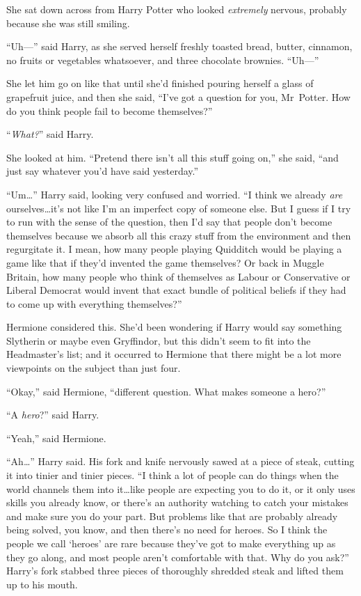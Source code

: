She sat down across from Harry Potter who looked \emph{extremely} nervous, probably because she was still smiling.

“Uh—” said Harry, as she served herself freshly toasted bread, butter, cinnamon, no fruits or vegetables whatsoever, and three chocolate brownies.
“Uh—”

She let him go on like that until she’d finished pouring herself a glass of grapefruit juice, and then she said,
“I’ve got a question for you, Mr~Potter. How do you think people fail to become themselves?”

“\emph{What?}” said Harry.

She looked at him.
“Pretend there isn’t all this stuff going on,” she said, “and just say whatever you’d have said yesterday.”

“Um…” Harry said, looking very confused and worried.
“I think we already \emph{are} ourselves…it’s not like I’m an imperfect copy of someone else. But I guess if I try to run with the sense of the question, then I’d say that people don’t become themselves because we absorb all this crazy stuff from the environment and then regurgitate it. I mean, how many people playing Quidditch would be playing a game like that if they’d invented the game themselves? Or back in Muggle Britain, how many people who think of themselves as Labour or Conservative or Liberal Democrat would invent that exact bundle of political beliefs if they had to come up with everything themselves?”

Hermione considered this. She’d been wondering if Harry would say something Slytherin or maybe even Gryffindor, but this didn’t seem to fit into the Headmaster’s list; and it occurred to Hermione that there might be a lot more viewpoints on the subject than just four.

“Okay,” said Hermione, “different question. What makes someone a hero?”

“A \emph{hero}?” said Harry.

“Yeah,” said Hermione.

“Ah…” Harry said. His fork and knife nervously sawed at a piece of steak, cutting it into tinier and tinier pieces.
“I think a lot of people can do things when the world channels them into it…like people are expecting you to do it, or it only uses skills you already know, or there’s an authority watching to catch your mistakes and make sure you do your part. But problems like that are probably already being solved, you know, and then there’s no need for heroes. So I think the people we call ‘heroes’ are rare because they’ve got to make everything up as they go along, and most people aren’t comfortable with that. Why do you ask?” Harry’s fork stabbed three pieces of thoroughly shredded steak and lifted them up to his mouth.


